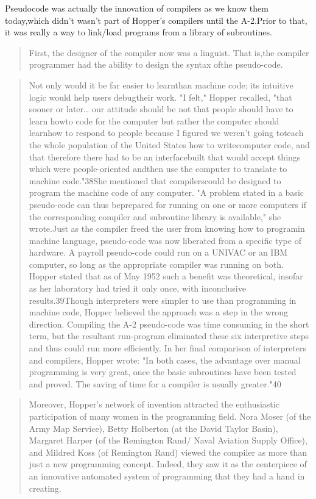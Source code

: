 Pseudocode was actually the innovation of compilers as we know them today,which
didn't wasn't part of Hopper's compilers until the A-2.Prior to that, it was
really a way to link/load programs from a library of
subroutines.
\begin{quotation}
	First, the designer of the compiler now was a linguist. That is,the compiler
	programmer had the ability to design the syntax ofthe
	pseudo-code.
\end{quotation}
\begin{quotation}
	Not only would it be far easier to learnthan machine code; its intuitive logic
	would help users debugtheir work. "I felt," Hopper recalled, "that sooner or
	later\dots
	our attitude should be not that people should have to learn howto code for the
	computer but rather the computer should learnhow to respond to people because I
	figured we weren't going toteach the whole population of the United States how
	to writecomputer code, and that therefore there had to be an interfacebuilt
	that would accept things which were people-oriented andthen use the computer to
	translate to machine code."38She mentioned that compilerscould be designed to
	program the machine code of any computer. "A problem stated in a basic
	pseudo-code can thus beprepared for running on one or more computers if the
	corresponding compiler and subroutine library is available," she wrote.Just as
	the compiler freed the user from knowing how to programin machine language,
	pseudo-code was now liberated from a specific type of hardware. A payroll
	pseudo-code could run on a UNIVAC or an IBM computer, so long as the
	appropriate compiler was running on both. Hopper stated that as of May 1952 such
	a benefit was theoretical, insofar as her laboratory had tried it only once,
	with inconclusive results.39Though interpreters were simpler to use than
	programming in machine code, Hopper believed the approach was a step in the
	wrong direction. Compiling the A-2 pseudo-code was time consuming in the short
	term, but the resultant run-program eliminated these six interpretive steps and
	thus could run more efficiently. In her final comparison of interpreters and
	compilers, Hopper wrote: "In both cases, the advantage over manual programming
	is very great, once the basic subroutines have been tested and proved. The
	saving of time for a compiler is usually greater."40
\end{quotation}
\begin{quotation}
	Moreover, Hopper's network of invention attracted the enthusiastic participation
	of many women in the programming field.  Nora Moser (of the Army Map Service),
	Betty Holberton (at the David Taylor Basin), Margaret Harper (of the Remington
	Rand/ Naval Aviation Supply Office), and Mildred Koss (of Remington Rand) viewed
	the compiler as more than just a new programming concept. Indeed, they saw it as
	the centerpiece of an innovative automated system of programming that they had a
	hand in creating.
\end{quotation}
